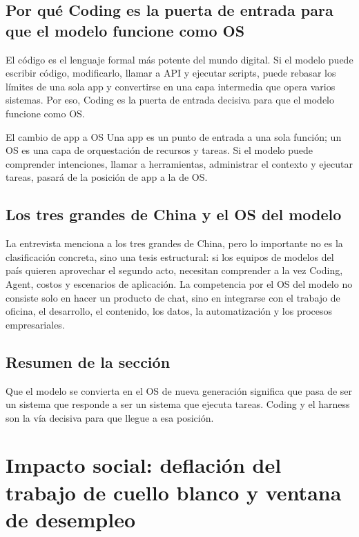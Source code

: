 \documentclass[a4paper]{article}
\begin{document}
\subsection{Por qué Coding es la puerta de entrada para que el modelo funcione como OS}

El código es el lenguaje formal más potente del mundo digital. Si el modelo puede escribir código, modificarlo, llamar a API y ejecutar scripts, puede rebasar los límites de una sola app y convertirse en una capa intermedia que opera varios sistemas. Por eso, Coding es la puerta de entrada decisiva para que el modelo funcione como OS.

\begin{importantbox}{El cambio de app a OS}
Una app es un punto de entrada a una sola función; un OS es una capa de orquestación de recursos y tareas. Si el modelo puede comprender intenciones, llamar a herramientas, administrar el contexto y ejecutar tareas, pasará de la posición de app a la de OS.
\end{importantbox}

\subsection{Los tres grandes de China y el OS del modelo}

La entrevista menciona a los tres grandes de China, pero lo importante no es la clasificación concreta, sino una tesis estructural: si los equipos de modelos del país quieren aprovechar el segundo acto, necesitan comprender a la vez Coding, Agent, costos y escenarios de aplicación. La competencia por el OS del modelo no consiste solo en hacer un producto de chat, sino en integrarse con el trabajo de oficina, el desarrollo, el contenido, los datos, la automatización y los procesos empresariales.

\subsection{Resumen de la sección}

Que el modelo se convierta en el OS de nueva generación significa que pasa de ser un sistema que responde a ser un sistema que ejecuta tareas. Coding y el harness son la vía decisiva para que llegue a esa posición.
\section{Impacto social: deflación del trabajo de cuello blanco y ventana de desempleo}
\end{document}
